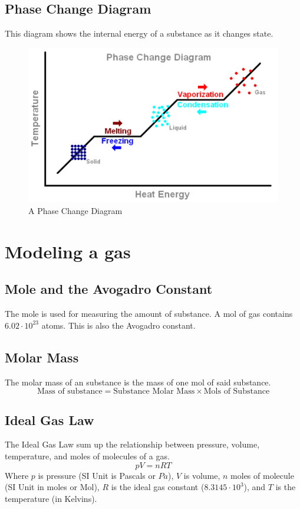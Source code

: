 \documentclass[../notes.tex]{subfiles}
\begin{document}
\subsection{Phase Change Diagram}
This diagram shows the internal energy of a substance as it changes state.
\begin{figure}[h]
\begin{center}
	\includegraphics[width=\textwidth]{./figures/phase change diagram.png}
	\caption{A Phase Change Diagram}
\end{center}
\end{figure}

\section{Modeling a gas}

\subsection{Mole and the Avogadro Constant}
The mole is used for measuring the amount of substance.
A mol of gas contains $6.02 \cdot 10^23$ atoms.
This is also the Avogadro constant.

\subsection{Molar Mass}
The molar mass of an substance is the mass of one mol of said substance.
\begin{equation}
	\textrm{Mass of substance} = \textrm{Substance Molar Mass} \times \textrm{Mols of Substance}
\end{equation}

\subsection{Ideal Gas Law}
The Ideal Gas Law sum up the relationship between pressure, volume, temperature, and moles of molecules of a gas.
\begin{equation}
	pV = nRT
\end{equation}
Where $p$ is pressure (SI Unit is Pascals or $Pa$), $V$ is volume, $n$ moles of molecule (SI Unit in moles or Mol), $R$ is the ideal gas constant ($8.3145 \cdot 10^3$), and $T$ is the temperature (in Kelvins).
\end{document}
